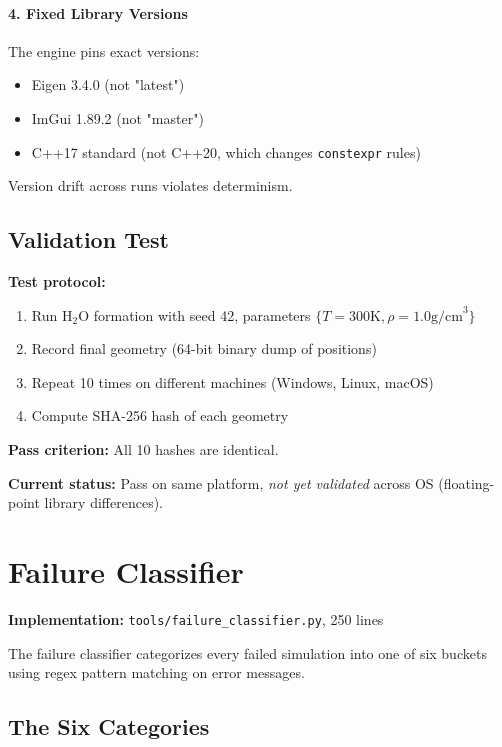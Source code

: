 \documentclass[11pt]{article}
\begin{document}
\paragraph{4. Fixed Library Versions}

The engine pins exact versions:
\begin{itemize}
\item Eigen 3.4.0 (not "latest")
\item ImGui 1.89.2 (not "master")
\item C++17 standard (not C++20, which changes \texttt{constexpr} rules)
\end{itemize}

Version drift across runs violates determinism.

\subsection{Validation Test}

\textbf{Test protocol:}
\begin{enumerate}
\item Run H$_2$O formation with seed 42, parameters $\{T=300\text{K}, \rho=1.0\text{g/cm}^3\}$
\item Record final geometry (64-bit binary dump of positions)
\item Repeat 10 times on different machines (Windows, Linux, macOS)
\item Compute SHA-256 hash of each geometry
\end{enumerate}

\textbf{Pass criterion:} All 10 hashes are identical.

\textbf{Current status:} Pass on same platform, \textit{not yet validated} across OS (floating-point library differences).

\section{Failure Classifier}

\textbf{Implementation:} \texttt{tools/failure\_classifier.py}, 250 lines

The failure classifier categorizes every failed simulation into one of six buckets using regex pattern matching on error messages.

\subsection{The Six Categories}
\end{document}
